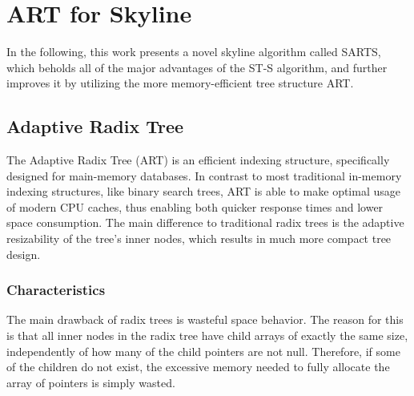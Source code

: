 \chapter{ART for Skyline} \label{chapter:ARTforSkyline}
In the following, this work presents a novel skyline algorithm called SARTS, which beholds all of the major advantages of the ST-S algorithm, and further improves it by utilizing the more memory-efficient tree structure ART. 

\section{Adaptive Radix Tree} \label{section:art}
The Adaptive Radix Tree (ART) \cite{art} is an efficient indexing structure, specifically designed for main-memory databases. In contrast to most traditional in-memory indexing structures, like binary search trees, ART is able to make optimal usage of modern CPU caches, thus enabling both quicker response times and lower space consumption. The main difference to traditional radix trees is the adaptive resizability of the tree's inner nodes, which results in much more compact tree design. 

\subsection{Characteristics} \label{section:art-characteristics}
The main drawback of radix trees is wasteful space behavior. The reason for this is that all inner nodes in the radix tree have child arrays of exactly the same size, independently of how many of the child pointers are not null. Therefore, if some of the children do not exist, the excessive memory needed to fully allocate the array of pointers is simply wasted. 

